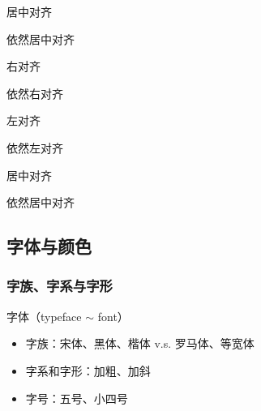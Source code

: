 \documentclass{ctexart}
\begin{document}
            \begin{center}
                居中对齐

                依然居中对齐
            \end{center}
        
            {\raggedleft 右对齐
            
            依然右对齐

            }

            {\raggedright 左对齐\par
            依然左对齐\par
            }

            {\centering 居中对齐
            \par 依然居中对齐
            
            }


    \subsection{字体与颜色}
        \subsubsection{字族、字系与字形}
            字体（typeface $\sim$ font）
            \begin{itemize}
                \item 字族：宋体、黑体、楷体 v.s. 罗马体、等宽体
                \item 字系和字形：加粗、加斜
                \item 字号：五号、小四号
            \end{itemize}
\end{document}
